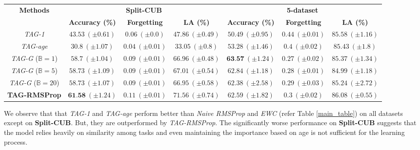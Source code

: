 \documentclass{article} \usepackage{collas2022_conference,times}
\begin{document}
{\begin{table*}[t!]
{\begin{tabular}{c c c c c c c}
        \hline
        \multirow{2}{*}{\textbf{Methods}} &   \multicolumn{3}{c}{\textbf{Split-CUB}} & \multicolumn{3}{c}{\textbf{5-dataset}}\\
                        \cmidrule(lr){2-4} \cmidrule(l){5-7}
             &  \textbf{Accuracy (\%)} & \textbf{Forgetting} & \textbf{LA (\%)} & \textbf{Accuracy (\%)} & \textbf{Forgetting} & \textbf{LA (\%)} \\
        \midrule
        \textit{TAG-1} &   $ 43.53 ~(\pm 0.61 )$ & $ 0.06 ~(\pm 0.0 )$ & $ 47.86 ~(\pm 0.49 )$ & $ 50.49 ~(\pm 0.95 )$ & $ 0.44 ~(\pm 0.01 )$ & $ 85.58 ~(\pm 1.16 )$ \\
        \textit{TAG-age} & $ 30.8 ~(\pm 1.07 )$ & $ 0.04 ~(\pm 0.01 )$ & $ 33.05 ~(\pm 0.8 )$ & $ 53.28 ~(\pm 1.46 )$ & $ 0.4 ~(\pm 0.02 )$ & $ 85.43 ~(\pm 1.8 )$\\
        \hline
        \textit{TAG-G} ($\mathbb{B}=1$) &   $ 58.7 ~(\pm 1.04 )$ & $ 0.09 ~(\pm 0.01 )$ & $ 66.96 ~(\pm 0.48 )$ & $ \textbf{63.57} ~(\pm 1.24 )$ & $ 0.27 ~(\pm 0.02 )$ & $ 85.37 ~(\pm 1.34 )$ \\
        \textit{TAG-G} ($\mathbb{B}=5$) & $ 58.73 ~(\pm 1.09 )$ & $ 0.09 ~(\pm 0.01 )$ & $ 67.01 ~(\pm 0.54 )$ & $ 62.84 ~(\pm 1.18 )$ & $ 0.28 ~(\pm 0.01 )$ & $ 84.99 ~(\pm 1.18 )$\\
        \textit{TAG-G} ($\mathbb{B}=20$) & $ 58.73 ~(\pm 1.07 )$ & $ 0.09 ~(\pm 0.01 )$ & $ 66.95 ~(\pm 0.58 )$ & $ 62.38 ~(\pm 2.58 )$ & $ 0.29 ~(\pm 0.03 )$ & $ 85.24 ~(\pm 2.72 )$ \\
        \hline        
        \textbf{TAG-RMSProp} & $ \textbf{61.58} ~(\pm 1.24 )$ & $ 0.11 ~(\pm 0.01 )$ & $ 71.56 ~(\pm 0.74 )$ & $ 62.59 ~(\pm 1.82 )$ & $ 0.3 ~(\pm 0.02 )$ & $ 86.08 ~(\pm 0.55 )$\\
        \hline
        \end{tabular}}
        \label{ablation}
    \end{table*}

We observe that that \textit{TAG-1} and \textit{TAG-age} perform better than \textit{Naive RMSProp} and \textit{EWC} (refer Table \ref{main_table}) on all datasets except on \textbf{Split-CUB}. But, they are outperformed by \textit{TAG-RMSProp}. The significantly worse performance on \textbf{Split-CUB} suggests that the model relies heavily on similarity among tasks and even maintaining the importance based on age is not sufficient for the learning process. 

}
\end{document}
